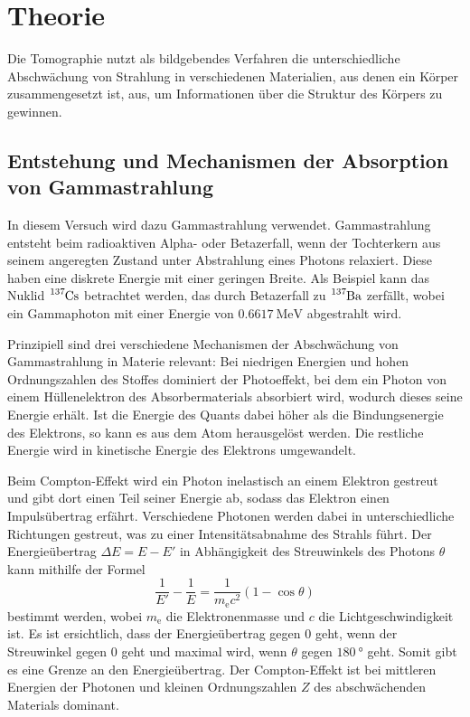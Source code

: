 \section{Theorie}
\label{sec:Theorie}

Die Tomographie nutzt als bildgebendes Verfahren die unterschiedliche Abschwächung von Strahlung in verschiedenen Materialien, aus denen ein Körper zusammengesetzt ist, aus, um Informationen über die Struktur des Körpers zu gewinnen.

\subsection{Entstehung und Mechanismen der Absorption von Gammastrahlung}
\label{subsec:theorie1}

In diesem Versuch wird dazu Gammastrahlung verwendet. Gammastrahlung entsteht beim radioaktiven Alpha- oder Betazerfall, wenn der Tochterkern aus seinem angeregten Zustand unter Abstrahlung eines Photons relaxiert. Diese haben eine diskrete Energie mit einer geringen Breite.
Als Beispiel kann das Nuklid $\ce{^{137}Cs}$ betrachtet werden, das durch Betazerfall zu $\ce{^{137}Ba}$ zerfällt, wobei ein Gammaphoton mit einer Energie von $\SI{0.6617}{\mega\electronvolt}$ abgestrahlt wird.

Prinzipiell sind drei verschiedene Mechanismen der Abschwächung von Gammastrahlung in Materie relevant: Bei niedrigen Energien und hohen Ordnungszahlen des Stoffes dominiert der Photoeffekt, bei dem ein Photon von einem Hüllenelektron des Absorbermaterials
absorbiert wird, wodurch dieses seine Energie erhält. Ist die Energie des Quants dabei höher als die Bindungsenergie des Elektrons, so kann es aus dem Atom herausgelöst werden. Die restliche Energie wird in kinetische Energie des Elektrons umgewandelt.

Beim Compton-Effekt wird ein Photon inelastisch an einem Elektron gestreut und gibt dort einen Teil seiner Energie ab, sodass das Elektron einen Impulsübertrag erfährt.
Verschiedene Photonen werden dabei in unterschiedliche Richtungen gestreut, was zu einer Intensitätsabnahme
des Strahls führt.
Der Energieübertrag $\Delta E = E - E'$ in Abhängigkeit des Streuwinkels des Photons $\theta$ kann mithilfe der Formel
\begin{equation}
	\frac{1}{E'} - \frac{1}{E} = \frac{1}{m_\text{e} c^2} (1-\cos\theta)
\end{equation}
bestimmt werden, wobei $m_\text{e}$ die Elektronenmasse und $c$ die Lichtgeschwindigkeit ist. Es ist ersichtlich, dass der Energieübertrag gegen 0 geht, wenn der Streuwinkel gegen 0 geht und maximal wird, wenn $\theta$ gegen $\SI{180}{\degree}$ geht. Somit gibt es eine Grenze an den Energieübertrag.
Der Compton-Effekt ist bei mittleren Energien der Photonen und kleinen Ordnungszahlen $Z$ des abschwächenden Materials dominant.

